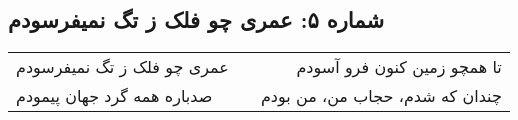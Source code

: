 \begin{center}
\section*{شماره ۵: عمری چو فلک ز تگ نمیفرسودم}
\label{sec:005}
\begin{longtable}{l p{0.5cm} r}
عمری چو فلک ز تگ نمیفرسودم
&&
تا همچو زمین کنون فرو آسودم
\\
صدباره همه گرد جهان پیمودم
&&
چندان که شدم، حجاب من، من بودم
\\
\end{longtable}
\end{center}
